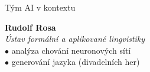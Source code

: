 \documentclass[aspectratio=169,dvipsnames]{beamer}
\begin{document}
\begin{frame}{Tým AI v kontextu}
    \hspace{40pt}\begin{minipage}{70pt}
    \end{minipage}\begin{minipage}{250pt}
        \textbf{Rudolf Rosa} \\
        \textit{Ústav formální a aplikované lingvistiky} \\
        \quad$\bullet$ analýza chování neuronových sítí \\
        \quad$\bullet$ generování jazyka (divadelních her)
    \end{minipage}

    \vspace{10pt}


\end{frame}
\end{document}
